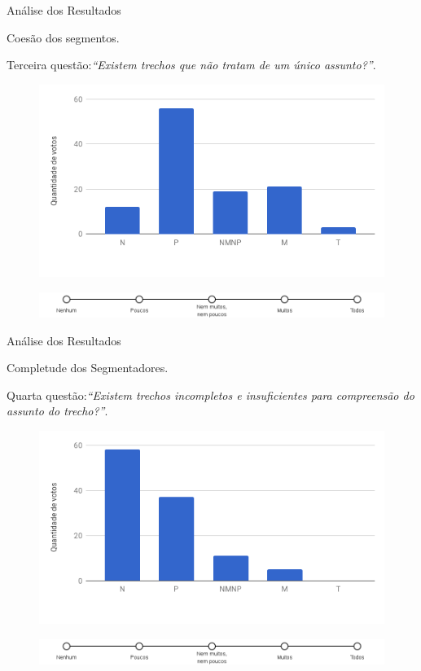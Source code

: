 \documentclass[xcolor=dvipsnames]{beamer}
\begin{document}
\begin{frame}{Análise dos Resultados}

	Coesão dos segmentos.

	Terceira questão:\textit{``Existem trechos que não tratam de um único assunto?''}. 

\begin{figure}[!h] \centering     %
	\includegraphics[width=.48\textwidth]{images/figuras-experimento/Q3-Seg.png}
\end{figure}


\begin{figure}[!h] \centering     %
	\includegraphics[width=.9\textwidth]{images/likert-1.png}
\end{figure}


\end{frame}



\begin{frame}{Análise dos Resultados}

Completude dos Segmentadores.

	Quarta questão:\textit{``Existem trechos incompletos e insuficientes para compreensão do assunto do trecho?''}.


\begin{figure}[!h] \centering     %

	\includegraphics[width=.48\textwidth]{images/figuras-experimento/Q4-Seg.png}
	\label{fig:Q4}
\end{figure}

\begin{figure}[!h] \centering     %
	\includegraphics[width=.9\textwidth]{images/likert-1.png}
\end{figure}

\end{frame}
\end{document}
